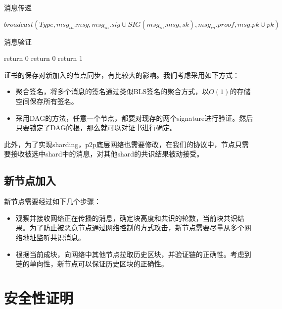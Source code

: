 \documentclass[12pt, UTF8]{article}
\begin{document}
 \newpage
\begin{algorithm}[H]
\DontPrintSemicolon
\SetAlgoNoEnd
\SetAlgoLined
\caption{消息传递}
 $broadcast(Type, msg_{in}.msg, msg_{in}.sig \cup SIG(msg_{in}.msg, sk), msg_{in}.proof, msg.pk \cup pk)$\;
\end{algorithm}


\begin{algorithm}[H]
\DontPrintSemicolon
\SetAlgoNoEnd
\SetAlgoLined
\caption{消息验证}
\DontPrintSemicolon
{}
 {
	return 0\;
}
 {
	return 0\;
}
 return 1\;
\end{algorithm}

证书的保存对新加入的节点同步，有比较大的影响。我们考虑采用如下方式：
\begin{itemize}
\item 聚合签名，将多个消息的签名通过类似BLS签名的聚合方式\cite{boneh2003survey}，以$O(1)$的存储空间保存所有签名。
\item 采用DAG的方法，任意一个节点，都要对现存的两个signature进行验证。然后只要锁定了DAG的根，那么就可以对证书进行确定。
\end{itemize}

此外，为了实现sharding，p2p底层网络也需要修改，在我们的协议中，节点只需要接收被选中shard中的消息，对其他shard的共识结果被动接受。

\subsection{新节点加入}
新节点需要经过如下几个步骤：
\begin{itemize}
\item 观察并接收网络正在传播的消息，确定块高度和共识的轮数，当前块共识结果。为了防止被恶意节点通过网络控制的方式攻击，新节点需要尽量从多个网络地址监听共识消息。
\item 根据当前成块，向网络中其他节点拉取历史区块，并验证链的正确性。考虑到链的单向性，新节点可以保证历史区块的正确性。
\end{itemize}

\section{安全性证明}
\end{document}

